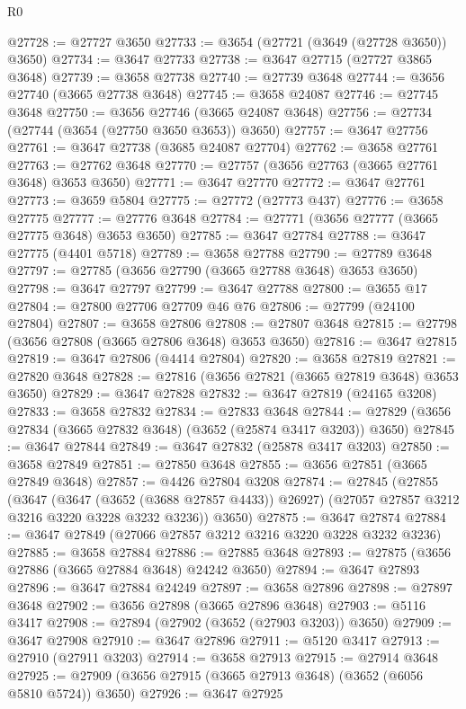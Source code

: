 \begin{lexlean}{R0}
\begin{coremodule}
@27728 := @27727 @3650
@27733 := @3654 (@27721 (@3649 (@27728 @3650)) @3650)
@27734 := @3647 @27733
@27738 := @3647 @27715 (@27727 @3865 @3648)
@27739 := @3658 @27738
@27740 := @27739 @3648
@27744 := @3656 @27740 (@3665 @27738 @3648)
@27745 := @3658 @24087
@27746 := @27745 @3648
@27750 := @3656 @27746 (@3665 @24087 @3648)
@27756 := @27734 (@27744 (@3654 (@27750 @3650 @3653)) @3650)
@27757 := @3647 @27756
@27761 := @3647 @27738 (@3685 @24087 @27704)
@27762 := @3658 @27761
@27763 := @27762 @3648
@27770 := @27757 (@3656 @27763 (@3665 @27761 @3648) @3653 @3650)
@27771 := @3647 @27770
@27772 := @3647 @27761
@27773 := @3659 @5804
@27775 := @27772 (@27773 @437)
@27776 := @3658 @27775
@27777 := @27776 @3648
@27784 := @27771 (@3656 @27777 (@3665 @27775 @3648) @3653 @3650)
@27785 := @3647 @27784
@27788 := @3647 @27775 (@4401 @5718)
@27789 := @3658 @27788
@27790 := @27789 @3648
@27797 := @27785 (@3656 @27790 (@3665 @27788 @3648) @3653 @3650)
@27798 := @3647 @27797
@27799 := @3647 @27788
@27800 := @3655 @17
@27804 := @27800 @27706 @27709 @46 @76
@27806 := @27799 (@24100 @27804)
@27807 := @3658 @27806
@27808 := @27807 @3648
@27815 := @27798 (@3656 @27808 (@3665 @27806 @3648) @3653 @3650)
@27816 := @3647 @27815
@27819 := @3647 @27806 (@4414 @27804)
@27820 := @3658 @27819
@27821 := @27820 @3648
@27828 := @27816 (@3656 @27821 (@3665 @27819 @3648) @3653 @3650)
@27829 := @3647 @27828
@27832 := @3647 @27819 (@24165 @3208)
@27833 := @3658 @27832
@27834 := @27833 @3648
@27844 := @27829 (@3656 @27834 (@3665 @27832 @3648) (@3652 (@25874 @3417 @3203)) @3650)
@27845 := @3647 @27844
@27849 := @3647 @27832 (@25878 @3417 @3203)
@27850 := @3658 @27849
@27851 := @27850 @3648
@27855 := @3656 @27851 (@3665 @27849 @3648)
@27857 := @4426 @27804 @3208
@27874 := @27845
    (@27855
      (@3647
        (@3647 (@3652 (@3688 @27857 @4433)) @26927)
        (@27057 @27857 @3212 @3216 @3220 @3228 @3232 @3236))
      @3650)
@27875 := @3647 @27874
@27884 := @3647 @27849 (@27066 @27857 @3212 @3216 @3220 @3228 @3232 @3236)
@27885 := @3658 @27884
@27886 := @27885 @3648
@27893 := @27875 (@3656 @27886 (@3665 @27884 @3648) @24242 @3650)
@27894 := @3647 @27893
@27896 := @3647 @27884 @24249
@27897 := @3658 @27896
@27898 := @27897 @3648
@27902 := @3656 @27898 (@3665 @27896 @3648)
@27903 := @5116 @3417
@27908 := @27894 (@27902 (@3652 (@27903 @3203)) @3650)
@27909 := @3647 @27908
@27910 := @3647 @27896
@27911 := @5120 @3417
@27913 := @27910 (@27911 @3203)
@27914 := @3658 @27913
@27915 := @27914 @3648
@27925 := @27909 (@3656 @27915 (@3665 @27913 @3648) (@3652 (@6056 @5810 @5724)) @3650)
@27926 := @3647 @27925

\end{coremodule}
\end{lexlean}
